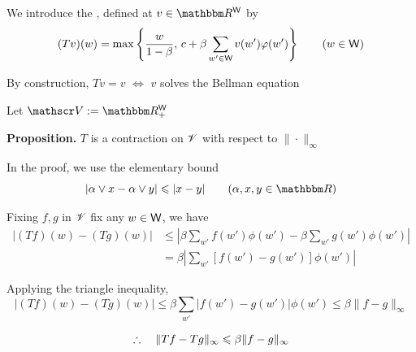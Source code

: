 \begin{frame}

    We introduce the , defined at
    $v \in \RR^\Wsf$ by
    \begin{equation*}
        (Tv)(w) 
        = 
        \max 
        \left\{
            \frac{w}{1-\beta}
            ,\,
            c + \beta \sum_{w' \in \mathsf W} v(w') \varphi(w')
        \right\}
        \qquad (w \in \mathsf W)
    \end{equation*}

    By construction, $Tv=v$ $\iff$ $v$ solves the Bellman equation 

        \vspace{0.5em}
    Let $\vV := \RR^\Wsf_+$ 

        \vspace{0.5em}
    {\bf Proposition.} $T$ is a contraction on $\mathscr V$
        with respect to $\| \cdot \|_\infty$

        \vspace{0.5em}
    In the proof, we use the elementary bound
    \begin{equation*}
        |\alpha \vee x - \alpha \vee y| \leq |x - y|
        \qquad (\alpha, x, y \in \RR)
    \end{equation*}

\end{frame}


\begin{frame}
    
    Fixing $f, g$ in $\mathscr V$ fix any $w \in \mathsf W$, we have 
    \begin{align*}
        |(Tf)(w) - (Tg)(w)|
        & \leq \left|
        \beta \sum_{w'} f(w') \phi(w')
                -
                \beta \sum_{w'} g(w') \phi(w')  
            \right|
        \\
        & = \beta 
            \left|
            \sum_{w'} [f(w') - g(w')] \phi(w') 
            \right|
    \end{align*}

    Applying the triangle inequality,
    \begin{equation*}
        |(Tf)(w) - (Tg)(w)|
        \leq \beta \sum_{w'} |f(w') - g(w')| \phi(w') 
        \leq \beta \| f - g \|_\infty 
    \end{equation*}

    \begin{equation*}
        \therefore \quad
        \|Tf - Tg \|_\infty \leqslant \beta \| f - g \|_\infty 
    \end{equation*}

\end{frame}

